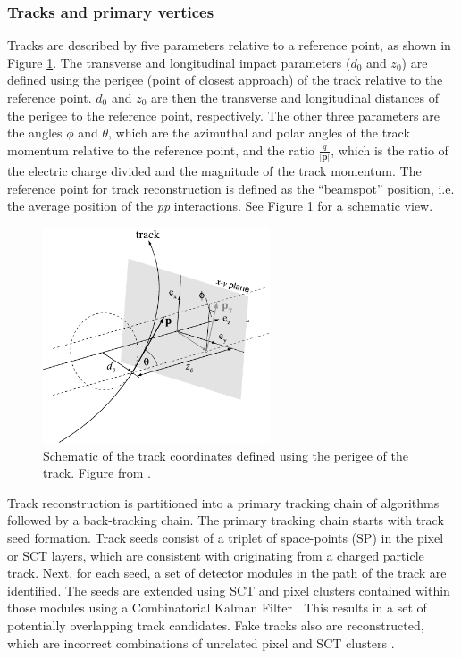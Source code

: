 \subsubsection{Tracks and primary vertices\label{sec:tracking}}
Tracks are described by five parameters relative to a reference point, as shown in Figure \ref{fig:trackcoords}. The transverse and longitudinal impact parameters ($d_0$ and $z_0$) are defined using the perigee (point of closest approach) of the track relative to the reference point. $d_0$ and $z_0$ are then the transverse and longitudinal distances of the perigee to the reference point, respectively. The other three parameters are the angles $\phi$ and $\theta$, which are the azimuthal and polar angles of the track momentum relative to the reference point, and the ratio $\frac{q}{|\mathbf{p}|}$, which is the ratio of the electric charge divided and the magnitude of the track momentum. The reference point for track reconstruction is defined as the ``beamspot'' position, i.e. the average position of the \textit{pp} interactions. See Figure \ref{fig:trackcoords} for a schematic view.
\begin{figure}[t]
    \centering
    \includegraphics[width=0.6\textwidth]{plots/atlas/trackcoordinates.pdf}
    \caption{Schematic of the track coordinates defined using the perigee of the track. Figure from \cite{Atlas:trackcoords}\label{fig:trackcoords}.}
\end{figure}

Track reconstruction is partitioned into a primary tracking chain of algorithms followed by a back-tracking chain. %
The primary tracking chain starts with track seed formation. Track seeds consist of a triplet of space-points (SP) in the pixel or SCT layers, which are consistent with originating from a charged particle track. Next, for each seed, a set of detector modules in the path of the track are identified. The seeds are extended using SCT and pixel clusters contained within those modules using a Combinatorial Kalman Filter \cite{Atlas:kalman}. This results in a set of potentially overlapping track candidates. Fake tracks also are reconstructed, which are incorrect combinations of unrelated pixel and SCT clusters \cite{Atlas:trackingsoftwaretut}.

